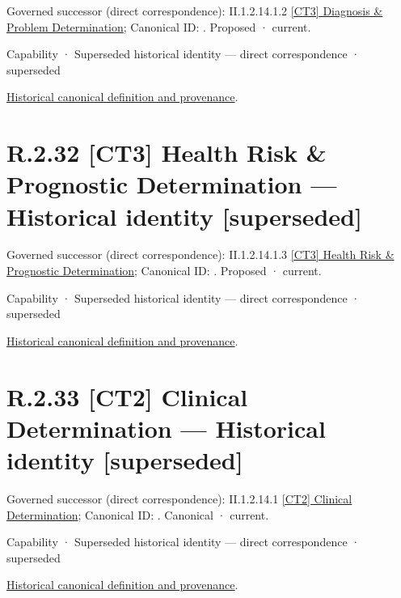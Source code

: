 {\small Governed successor (direct correspondence): II.1.2.14.1.2 \hyperref[element:d965032637e64275b7a61c0413834590]{[CT3] Diagnosis \& Problem Determination}; Canonical ID: \texttt{}. Proposed · current.}\par
\label{element:e575c583783546ef85cf898523d18797}
{\small Capability · Superseded historical identity — direct correspondence · superseded}\par
\href{../../../../../../../continuum/strategy/capability/e575c583783546ef85cf898523d18797.md}{Historical canonical definition and provenance}.\par
\section*{R.2.32 [CT3] Health Risk \& Prognostic Determination — Historical identity [superseded]}
\label{navigation:R.2.32}

{\small Governed successor (direct correspondence): II.1.2.14.1.3 \hyperref[element:5bba0ea969814b5fa7ad11b67ab40a0c]{[CT3] Health Risk \& Prognostic Determination}; Canonical ID: \texttt{}. Proposed · current.}\par
\label{element:3215f0b0e1ce45e8ab16dae272ea6fe7}
{\small Capability · Superseded historical identity — direct correspondence · superseded}\par
\href{../../../../../../../continuum/strategy/capability/3215f0b0e1ce45e8ab16dae272ea6fe7.md}{Historical canonical definition and provenance}.\par
\section*{R.2.33 [CT2] Clinical Determination — Historical identity [superseded]}
\label{navigation:R.2.33}

{\small Governed successor (direct correspondence): II.1.2.14.1 \hyperref[element:39219464b6304b59bd7c3de4e237066e]{[CT2] Clinical Determination}; Canonical ID: \texttt{}. Canonical · current.}\par
\label{element:018ccd818ec142fba1ffb086d900acc6}
{\small Capability · Superseded historical identity — direct correspondence · superseded}\par
\href{../../../../../../../continuum/strategy/capability/018ccd818ec142fba1ffb086d900acc6.md}{Historical canonical definition and provenance}.\par
